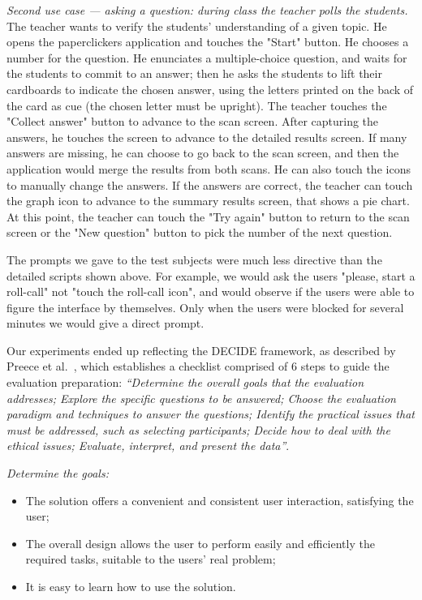 \textit{Second use case --- asking a question: during class the teacher polls the students.} The teacher wants to verify the students' understanding of a given topic. He opens the paperclickers application and touches the "Start" button. He chooses a number for the question. He enunciates a multiple-choice question, and waits for the students to commit to an answer; then he asks the students to lift their cardboards to indicate the chosen answer, using the letters printed on the back of the card as cue (the chosen letter must be upright). The teacher touches the "Collect answer" button to advance to the scan screen. After capturing the answers, he touches the screen to advance to the detailed results screen. If many answers are missing, he can choose to go back to the scan screen, and then the application would merge the results from both scans. He can also touch the icons to manually change the answers. If the answers are correct, the teacher can touch the graph icon to advance to the summary results screen, that shows a pie chart. At this point, the teacher can touch the "Try again" button to return to the scan screen or the "New question" button to pick the number of the next question.

The prompts we gave to the test subjects were much less directive than the detailed scripts shown above. For example, we would ask the users "please, start a roll-call" not "touch the roll-call icon", and would observe if the users were able to figure the interface by themselves. Only when the users were blocked for several minutes we would give a direct prompt.

Our experiments ended up reflecting the DECIDE framework, as described by Preece et al.~\cite{preece2002interaction}, which establishes a checklist comprised of 6 steps to guide the evaluation preparation: \textit{“Determine the overall goals that the evaluation addresses; Explore the specific questions to be answered; Choose the evaluation paradigm and techniques to answer the questions; Identify the practical issues that must be addressed, such as selecting participants; Decide how to deal with the ethical issues; Evaluate, interpret, and present the data”}.

\emph{Determine the goals:}
\begin{itemize}
    \item The solution offers a convenient and consistent user interaction, satisfying the user;
    \item The overall design allows the user to perform easily and efficiently the required tasks, suitable to the users' real problem;
    \item It is easy to learn how to use the solution.
\end{itemize}

